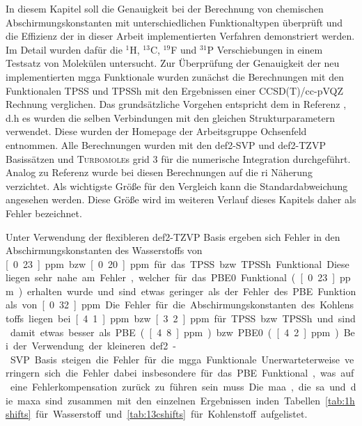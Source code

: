In diesem Kapitel soll die Genauigkeit bei der Berechnung von chemischen Abschirmungskonstanten mit unterschiedlichen Funktionaltypen überprüft und die Effizienz der in dieser Arbeit implementierten Verfahren demonstriert werden. Im Detail wurden dafür die $^1$H, $^{13}$C, $^{19}$F und $^{31}$P Verschiebungen in einem Testsatz von Molekülen untersucht.\supercite{reiter2017calculation} Zur Überprüfung der Genauigkeit der neu implementierten \ac{mgga} Funktionale wurden zunächst die Berechnungen mit den Funktionalen TPSS und TPSSh mit den Ergebnissen einer CCSD(T)/cc-pVQZ Rechnung verglichen. Das grundsätzliche Vorgehen entspricht dem in Referenz \cite{flaig2014benchmarking}, d.h es wurden die selben Verbindungen mit den gleichen Strukturparametern verwendet. Diese wurden der Homepage der Arbeitsgruppe Ochsenfeld\supercite{ochsenfeld:structures} entnommen. Alle Berechnungen wurden mit den def2-SVP und def2-TZVP Basissätzen\supercite{weigend2005balanced} und \textsc{Turbomole}s grid 3\supercite{treutler1995efficient,treutlerphdthesis} für die numerische Integration durchgeführt. Analog zu Referenz \cite{ochsenfeld2004ab} wurde bei diesen Berechnungen auf die \ac{ri} Näherung verzichtet. Als wichtigste Größe für den Vergleich kann die Standardabweichung angesehen werden\supercite{flaig2014benchmarking}. Diese Größe wird im weiteren Verlauf dieses Kapitels daher als \glqq Fehler\grqq{} bezeichnet.

Unter Verwendung der flexibleren def2-TZVP Basis ergeben sich Fehler in den Abschirmungskonstanten des Wasserstoffs von \unit[0.23]{ppm} bzw. \unit[0.20]{ppm} für das TPSS bzw. TPSSh Funktional. Diese liegen sehr nahe am Fehler, welcher für das PBE0 Funktional (\unit[0.23]{ppm}) erhalten wurde und sind etwas geringer als der Fehler des PBE Funktionals von \unit[0.32]{ppm}. Die Fehler für die Abschirmungskonstanten des Kohlenstoffs liegen bei \unit[4.1]{ppm} bzw. \unit[3.2]{ppm} für TPSS bzw. TPSSh und sind damit etwas besser als PBE (\unit[4.8]{ppm}) bzw. PBE0 (\unit[4.2]{ppm}) Bei der Verwendung der kleineren def2-SVP Basis steigen die Fehler für die \ac{mgga} Funktionale. Unerwarteterweise verringern sich die Fehler dabei insbesondere für das PBE Funktional, was auf eine Fehlerkompensation zurück zu führen sein muss. Die \ac{maa}, die \ac{sa} und die \ac{maxa} sind zusammen mit den einzelnen Ergebnissen inden Tabellen \ref{tab:1hshifts} für Wasserstoff und \ref{tab:13cshifts} für Kohlenstoff aufgelistet.

